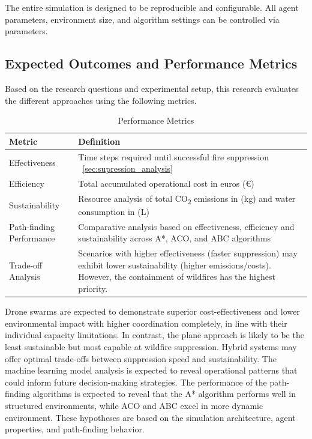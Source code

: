 \documentclass[11pt, a4paper]{article}
\begin{document}
The entire simulation is designed to be reproducible and configurable. All agent parameters, environment size, and algorithm settings can be controlled via parameters.

\subsection{Expected Outcomes and Performance Metrics}
Based on the research questions and experimental setup, this research evaluates the different approaches using the following metrics.
\begin{table}[h!]
\centering
\begin{tabular}{|l|p{7cm}|}
\hline
\textbf{Metric} & \textbf{Definition}\\
\hline
Effectiveness & Time steps required until successful fire suppression ~\ref{sec:supression_analysis}\\
\hline
Efficiency & Total accumulated operational cost in euros (€) \\
\hline
Sustainability & Resource analysis of total CO\textsubscript{2} emissions in (kg) and water consumption in (L)  \\
\hline
Path-finding Performance & Comparative analysis based on effectiveness, efficiency and sustainability across A*, ACO, and ABC algorithms\\
\hline
Trade-off Analysis & Scenarios with higher effectiveness (faster suppression) may exhibit lower sustainability (higher emissions/costs). However, the containment of wildfires has the highest priority. \\
\hline
\end{tabular}
\caption{Performance Metrics}
\end{table}

Drone swarms are expected to demonstrate superior cost-effectiveness and lower environmental impact with higher coordination completely, in line with their individual capacity limitations. In contrast, the plane approach is likely to be the least sustainable but most capable at wildfire suppression. Hybrid systems may offer optimal trade-offs between suppression speed and sustainability. The machine learning model analysis is expected to reveal operational patterns that could inform future decision-making strategies. The performance of the path-finding algorithms is expected to reveal that the A* algorithm performs well in structured environments, while ACO and ABC excel in more dynamic environment. These hypotheses are based on the 
simulation architecture, agent properties, and path-finding behavior.
\end{document}
